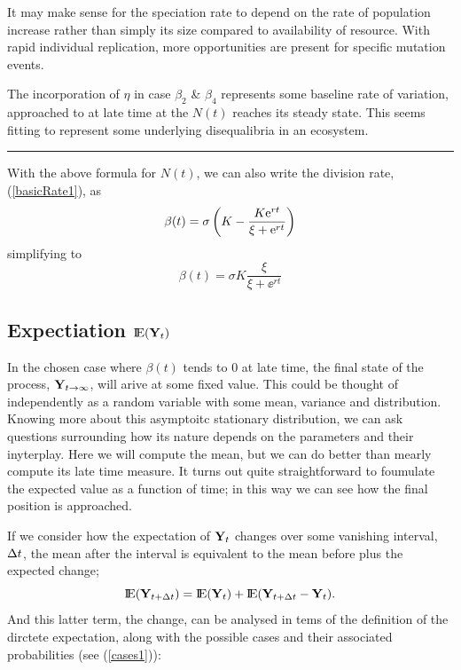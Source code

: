 It may make sense for the speciation rate to depend on the rate of population increase rather than simply its size compared to availability of resource. With rapid individual replication, more opportunities are present for specific mutation events.\par
The incorporation of $\eta$ in case $\beta_2$ \& $\beta_4$ represents some baseline rate of variation, approached to at late time at the $N(t)$ reaches its steady state. This seems fitting to represent some underlying disequalibria in an ecosystem.  
\vspace{10pt}
\hrule
\vspace{10pt}

\noindent
With the above formula for $N(t)$, we can also write the division rate, (\ref{basicRate1}), as 
$$\beta(t) = \sigma\left( K - \frac{K{\rm e}^{rt}}{\xi + {\rm e}^{rt}}\right)$$
simplifying to 
$$\beta(t) = \sigma K \frac{\xi}{\xi + \ee^{rt}}$$


\subsection{Expectiation ${\rm I}\!{\rm E}({{\bf Y}_t})$}
In the chosen case where $\beta(t)$ tends to 0 at late time, the final state of the process, ${\bf Y}_{t\to\infty}$, will arive at some fixed value. This could be thought of independently as a random variable with some mean, variance and distribution. Knowing more about this asymptoitc stationary distribution, we can ask questions surrounding how its nature depends on the parameters and their inyterplay. Here we will compute the mean, but we can do better than mearly compute its late time measure. It turns out quite straightforward to foumulate the expected value as a function of time; in this way we can see how the final position is approached. \par

If we consider how the expectation of ${\bf Y}_t$ changes over some vanishing interval, $\Delta t$, the mean after the interval is equivalent to the mean before plus the expected change;
\begin{equation}
\label{ExpectChange1} 
{\rm I}\!{\rm E}({\bf Y}_{t+\Delta t}) = {\rm I}\!{\rm E}({{\bf Y}_t}) + {\rm I}\!{\rm E}({\bf Y}_{t+\Delta t} - {\bf Y}_t).
\end{equation}
And this latter term, the change, can be analysed in tems of the definition of the dirctete expectation, along with the possible cases and their associated probabilities (see (\ref{cases1})):

